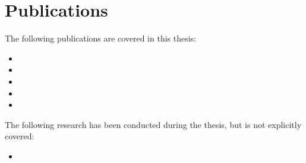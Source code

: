 \cleardoublepage
\chapter*{Publications}

The following publications are covered in this thesis:
\begin{itemize}
\item {}
\item {}
\item {}
\item {}
\item {}
\end{itemize}

\noindent The following research has been conducted during the thesis, but is not explicitly covered:
\begin{itemize}
\item {}
\end{itemize}
